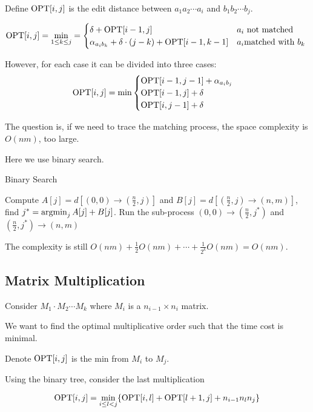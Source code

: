 Define  $ \mathrm{OPT}[i,j] $ is the edit distance between  $ a_1a_2\cdots a_i $ and  $ b_1b_2\cdots b_j $.



\[\mathrm{OPT}[i,j]=\min_{1 \leq k \leq j}=\begin{cases}
    \delta+\mathrm{OPT}[i-1,j]&a_i\text{ not matched}\\
    \alpha_{a_ib_k}+\delta\cdot (j-k)+\mathrm{OPT}[i-1,k-1]&a_i\text{matched with  $ b_k $ }
\end{cases}\]

However, for each case it can be divided into three cases:
\[\mathrm{OPT}[i,j]=\min\begin{cases}
    \mathrm{OPT}[i-1,j-1]+\alpha_{a_ib_j}\\
    \mathrm{OPT}[i-1,j]+\delta\\
    \mathrm{OPT}[i,j-1]+\delta
\end{cases}\]

The question is, if we need to trace the matching process, the space complexity is  $ O(nm) $, too large.

Here we use binary search.
\begin{algorithm}
    \caption{Binary Search}
    \begin{algorithmic}[1]
        \STATE Compute  $ A[j]=d[(0,0)\rightarrow(\frac{n}{2},j)] $ and  $B[j]= d[(\frac{n}{2},j)\rightarrow(n,m)] $,
        \STATE find  $ j^*=\operatorname{argmin}_j A[j]+B[j] $.
        \STATE Run the sub-process  $ (0,0)\rightarrow(\frac{n}{2},j^*) $ and  $ (\frac{n}{2},j^*)\rightarrow(n,m) $ 
    \end{algorithmic}
\end{algorithm}

The complexity is still  $ O(nm)+\frac{1}{2}O(nm)+\cdots+\frac{1}{2^k}O(nm)=O(nm) $.

\subsection{Matrix Multiplication}

\begin{example}
    Consider  $ M_1\cdot M_2\cdots M_k $ where  $ M_i $ is a  $ n_{i-1}\times n_i $ matrix. 

    We want to find the optimal multiplicative order such that the time cost is minimal.
\end{example}

Denote  $ \mathrm{OPT}[i,j] $ is the min from  $ M_i $ to  $ M_j $.

Using the binary tree, consider the last multiplication

\[\mathrm{OPT}[i,j]=\min_{i \leq l<j}\{\mathrm{OPT}[i,l]+\mathrm{OPT}[l+1,j]+n_{i-1}n_ln_j\}\]
